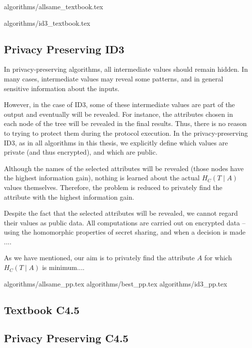 {algorithms/allsame_textbook.tex}

{algorithms/id3_textbook.tex}



\subsection{Privacy Preserving ID3}\label{s:pp-id3}


In privacy-preserving algorithms, all intermediate values should remain hidden.
In many cases, intermediate values may reveal some patterns, and in general sensitive information about the inputs.

However, in the case of ID3, some of these intermediate values are part of the output and eventually will be revealed.
For instance, the attributes chosen in each node of the tree will be revealed in the final results.
Thus, there is no reason to trying to protect them during the protocol execution.
In the privacy-preserving ID3, as in all algorithms in this thesis, we explicitly define which values are private (and thus encrypted), and which are public.

Although the names of the selected attributes will be revealed (those nodes have the highest information gain), nothing is learned about the actual $H_C(T \mid A)$ values themselves.
Therefore, the problem is reduced to privately find the attribute with the highest information gain.

Despite the fact that the selected attributes will be revealed, we cannot regard their values as public data.
All computations are carried out on encrypted data -- using the homomorphic properties of secret sharing, and when a decision is made ....



As we have mentioned, our aim is to privately find the attribute $A$ for which $H_C(T \mid A)$ is minimum....


{algorithms/allsame_pp.tex}
{algorithms/best_pp.tex}
{algorithms/id3_pp.tex}




\subsection{Textbook C4.5}\label{s:c45}

\subsection{Privacy Preserving C4.5}\label{s:pp-c45}


